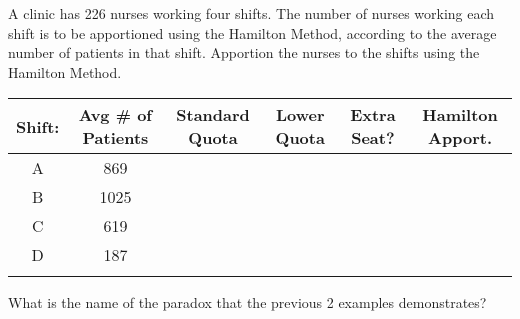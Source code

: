 \documentclass[11pt,epsfig]{article}
\begin{document}
\begin{problem}{20}
A clinic has 226 nurses working four shifts. The number of nurses working each shift is to be apportioned using the Hamilton Method, according to the average number of patients in that shift. Apportion the nurses to the shifts using the Hamilton Method.

 \begin{center}
 \begin{tabular}{ | c | c | c | c | c | c |}
   \hline
   Shift: & Avg \# of Patients & Standard Quota & Lower Quota & Extra Seat? & Hamilton Apport.\\ \hline
   A & 869 &  &  &  &  \\ \hline
   B & 1025 &  &  &  &  \\ \hline
   C & 619 &  &  &  &  \\ \hline
   D & 187 &  &  &  &  \\ \hline
    &  &  &  &  &  \\ \hline
   \end{tabular}
  \end{center}

\vfill
\end{problem}

\begin{problem}{10}
What is the name of the paradox that the previous 2 examples demonstrates?

\vfill
\end{problem}

\showpoints
\end{document}
